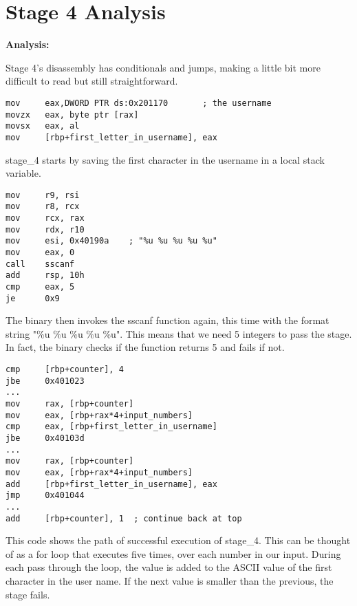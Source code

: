 \documentclass{article}
\begin{document}
\newpage
\section{Stage 4 Analysis}
\begin{flushleft}
\vspace{.5pc}
\end{flushleft}

\begin{flushleft}
\textbf{Analysis:}
\vspace{.5pc}
\end{flushleft}
\par
Stage 4's disassembly has conditionals and jumps, making a little bit more
difficult to read but still straightforward.

\begin{lstlisting}
mov     eax,DWORD PTR ds:0x201170       ; the username
movzx   eax, byte ptr [rax]
movsx   eax, al
mov     [rbp+first_letter_in_username], eax
\end{lstlisting}
stage\_4 starts by saving the first character in the username in a local 
stack variable.  

\begin{lstlisting}
mov     r9, rsi
mov     r8, rcx
mov     rcx, rax
mov     rdx, r10
mov     esi, 0x40190a    ; "%u %u %u %u %u"
mov     eax, 0
call    sscanf
add     rsp, 10h
cmp     eax, 5
je      0x9
\end{lstlisting}

The binary then invokes the sscanf function again, this time with the format 
string "\%u \%u \%u \%u \%u".  This means that we need 5 integers to pass the
stage.  In fact, the binary checks if the function returns 5 and fails if 
not.
\begin{lstlisting}
cmp     [rbp+counter], 4
jbe     0x401023
...
mov     rax, [rbp+counter]
mov     eax, [rbp+rax*4+input_numbers]
cmp     eax, [rbp+first_letter_in_username]
jbe     0x40103d
...
mov     rax, [rbp+counter]
mov     eax, [rbp+rax*4+input_numbers]
add     [rbp+first_letter_in_username], eax
jmp     0x401044
...
add     [rbp+counter], 1  ; continue back at top
\end{lstlisting}
This code shows the path of successful execution of stage\_4.  This can be 
thought of as a for loop that executes five times, over each number in our 
input.  During each pass through the loop, the value is added to the ASCII
value of the first character in the user name.  If the next value is smaller
than the previous, the stage fails.
\end{document}
